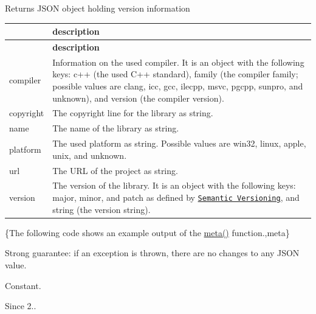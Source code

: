 \begin{DoxyReturn}{Returns}
J\+S\+ON object holding version information \tabulinesep=1mm
\begin{longtabu} spread 0pt [c]{*2{|X[-1]}|}
\hline
{}&{\bf description  }\\
\endfirsthead
\hline
\endfoot
\hline
{}&{\bf description  }\\
\endhead
{\ttfamily compiler} &Information on the used compiler. It is an object with the following keys\+: {\ttfamily c++} (the used C++ standard), {\ttfamily family} (the compiler family; possible values are {\ttfamily clang}, {\ttfamily icc}, {\ttfamily gcc}, {\ttfamily ilecpp}, {\ttfamily msvc}, {\ttfamily pgcpp}, {\ttfamily sunpro}, and {\ttfamily unknown}), and {\ttfamily version} (the compiler version). \\
{\ttfamily copyright} &The copyright line for the library as string. \\
{\ttfamily name} &The name of the library as string. \\
{\ttfamily platform} &The used platform as string. Possible values are {\ttfamily win32}, {\ttfamily linux}, {\ttfamily apple}, {\ttfamily unix}, and {\ttfamily unknown}. \\
{\ttfamily url} &The U\+RL of the project as string. \\
{\ttfamily version} &The version of the library. It is an object with the following keys\+: {\ttfamily major}, {\ttfamily minor}, and {\ttfamily patch} as defined by \href{http://semver.org}{\tt Semantic Versioning}, and {\ttfamily string} (the version string). \\
\end{longtabu}
\{The following code shows an example output of the {\ttfamily \hyperlink{classnlohmann_1_1basic__json_a677318a34ade7f8177a2784c06aa3671}{meta()}} function.,meta\}
\end{DoxyReturn}
Strong guarantee\+: if an exception is thrown, there are no changes to any J\+S\+ON value.

Constant.

\begin{DoxySince}{Since}
2.. 
\end{DoxySince}
